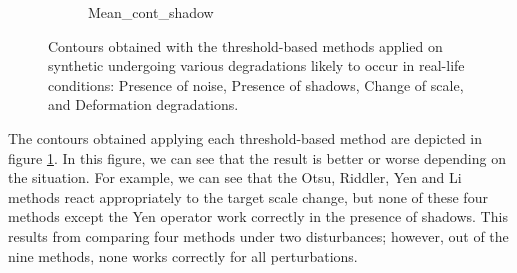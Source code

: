 \begin{figure}[htbp]
\begin{subfigure}[t]{0.15\textwidth}
{    {Mean_cont_shadow}}
    \caption{} 
\end{subfigure}\qquad
\begin{subfigure}[t]{0.15\textwidth}
    \caption{} 
\end{subfigure}\qquad
\begin{subfigure}[t]{0.15\textwidth}
    \caption{}  
\end{subfigure}
\caption{Contours obtained with the threshold-based methods applied on synthetic undergoing various degradations likely to occur in real-life conditions:  Presence of noise,  Presence of shadows,  Change of scale, and  Deformation degradations.}\label{fig:thr_synth_comparison}
\end{figure}

The contours obtained applying each threshold-based method are depicted in figure \ref{fig:thr_synth_comparison}. In this figure, we can see that the result is better or worse depending on the situation. For example, we can see that the Otsu, Riddler, Yen and Li methods react appropriately to the target scale change, but none of these four methods except the Yen operator work correctly in the presence of shadows. This results from comparing four methods under two disturbances; however, out of the nine methods, none works correctly for all perturbations.


